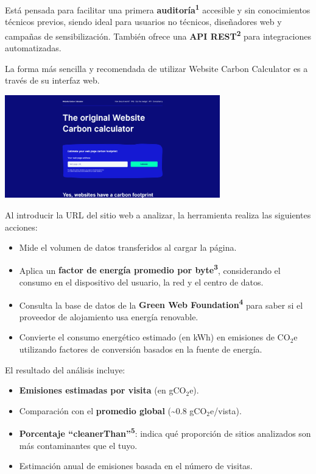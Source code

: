 \documentclass[12pt,a4paper]{report}
\begin{document}
Está pensada para facilitar una primera \textbf{auditoría\textsuperscript{1}} accesible y sin conocimientos técnicos previos, siendo ideal para usuarios no técnicos, diseñadores web y campañas de sensibilización. También ofrece una \textbf{API REST\textsuperscript{2}} para integraciones automatizadas.

La forma más sencilla y recomendada de utilizar Website Carbon Calculator es a través de su interfaz web.

\begin{center}
    \includegraphics[width=0.7\textwidth]{imagenes/WCC_1.png}
\end{center}

Al introducir la URL del sitio web a analizar, la herramienta realiza las siguientes acciones:

\begin{itemize}
    \item Mide el volumen de datos transferidos al cargar la página.
    \item Aplica un \textbf{factor de energía promedio por byte\textsuperscript{3}}, considerando el consumo en el dispositivo del usuario, la red y el centro de datos.
    \item Consulta la base de datos de la \textbf{Green Web Foundation\textsuperscript{4}} para saber si el proveedor de alojamiento usa energía renovable.
    \item Convierte el consumo energético estimado (en kWh) en emisiones de CO$_2$e utilizando factores de conversión basados en la fuente de energía.
\end{itemize}

El resultado del análisis incluye:

\begin{itemize}
    \item \textbf{Emisiones estimadas por visita} (en gCO$_2$e).
    \item Comparación con el \textbf{promedio global} (\textasciitilde0.8 gCO$_2$e/vista).
    \item \textbf{Porcentaje “cleanerThan”\textsuperscript{5}}: indica qué proporción de sitios analizados son más contaminantes que el tuyo.
    \item Estimación anual de emisiones basada en el número de visitas.
\end{itemize}
\end{document}
